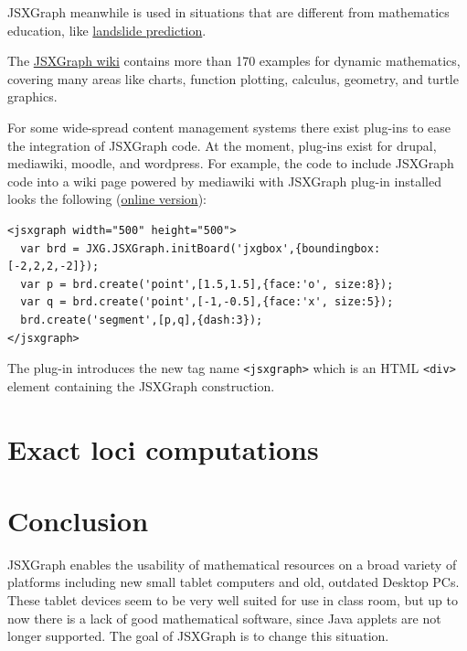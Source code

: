 \documentclass[12pt,a4paper]{article}%
\begin{document}
JSXGraph meanwhile is used in situations that are different 
from mathematics education, like 
\href{http://www.rhok.org/2010/06/rhok-1-0-washington-d-c-winning-hack-chasm/}{landslide prediction}. 

The \href{http://jsxgraph.uni-bayreuth.de/wiki}{JSXGraph wiki} 
contains more than 170 examples for dynamic mathematics, 
covering many areas like charts, function plotting, calculus, geometry, and turtle graphics.

For some wide-spread content management systems there exist plug-ins to ease the integration
of JSXGraph code. 
At the moment, plug-ins exist for drupal, mediawiki, moodle, and wordpress. 
For example, the code to include JSXGraph code into a wiki page powered by mediawiki with JSXGraph plug-in installed
looks the following (\href{http://jsxgraph.uni-bayreuth.de/wiki/index.php/MediaWiki_example}{online version}):

{\footnotesize
\begin{verbatim}
<jsxgraph width="500" height="500">
  var brd = JXG.JSXGraph.initBoard('jxgbox',{boundingbox:[-2,2,2,-2]});
  var p = brd.create('point',[1.5,1.5],{face:'o', size:8});
  var q = brd.create('point',[-1,-0.5],{face:'x', size:5});
  brd.create('segment',[p,q],{dash:3});
</jsxgraph>
\end{verbatim}}
The plug-in introduces the new tag name \verb|<jsxgraph>| which is an HTML \verb|<div>| element
containing the JSXGraph construction.


\section{Exact loci computations}\label{sec:loci}

\section{Conclusion}
JSXGraph enables the usability of mathematical resources on a broad variety of 
platforms including new small tablet computers and old, outdated Desktop PCs. 
These tablet devices seem to be very well suited for use in class room, 
but up to now there is a lack of good mathematical software, since Java applets are not longer supported. 
The goal of JSXGraph is to change this situation. 
\end{document}
